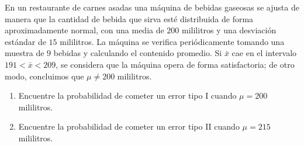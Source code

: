 \begin{enunciado}
 En un restaurante de carnes asadas una m\'aquina de bebidas gaseosas se ajusta de manera que la cantidad de bebida que sirva est\'e distribuida de forma aproximadamente normal, con una media de $200$ mililitros y una desviaci\'on est\'andar de $15$ mililitros. La m\'aquina se verifica peri\'odicamente tomando una muestra de $9$ bebidas y calculando el contenido promedio. Si $\bar{x}$ cae en el intervalo $191 < \bar{x} < 209$, se considera que la m\'aquina opera de forma satisfactoria; de otro modo, concluimos que $\mu \neq 200$ mililitros.
 \begin{enumerate}
  \item Encuentre la probabilidad de cometer un error tipo I cuando $\mu = 200$ mililitros.
  
  \item Encuentre la probabilidad de cometer un error tipo II cuando $\mu = 215$ mililitros.
 \end{enumerate}
\end{enunciado}

